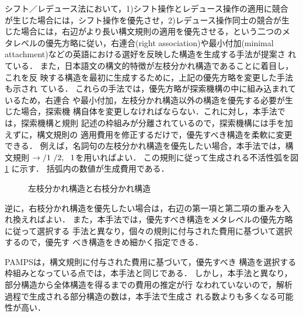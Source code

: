 シフト／レデュース法において，1)シフト操作とレデュース操作の適用に競合
が生じた場合には，シフト操作を優先させ，2)レデュース操作同士の競合が生
じた場合には，右辺がより長い構文規則の適用を優先させる，という二つのメ
タレベルの優先方略に従い，右連合(right association)や最小付加(minimal
attachment)などの英語における選好を反映した構造を生成する手法が提案さ
れている\cite{Shieber83}．
また，日本語文の構文的特徴が左枝分かれ構造であることに着目し，これを反
映する構造を最初に生成するために，上記の優先方略を変更した手法も示され
ている\cite{Shimazu89}． 
これらの手法では，優先方略が探索機構の中に組み込まれているため，右連合
や最小付加，左枝分かれ構造以外の構造を優先する必要が生じた場合，探索機
構自体を変更しなければならない．これに対し，本手法では，探索機構と規則
記述の枠組みが分離されているので，探索機構には手を加えずに，構文規則の
適用費用を修正するだけで，優先すべき構造を柔軟に変更できる．
例えば，名詞句の左枝分かれ構造を優先したい場合，本手法では，構文規則
$\NP \rightarrow \NP/1\ \NP/2,\ \ 1$を用いればよい．
この規則に従って生成される不活性弧を図\ref{fig:leftright} に示す．
括弧内の数値が生成費用である．
\begin{figure}
\begin{center}
\vspace{-0.5mm}
\end{center}
\caption{左枝分かれ構造と右枝分かれ構造}
\label{fig:leftright}
\vspace{-0.5mm}
\end{figure}
逆に，右枝分かれ構造を優先したい場合は，右辺の第一項と第二項の重みを入
れ換えればよい．
また，本手法では，優先すべき構造をメタレベルの優先方略に従って選択する
手法と異なり，個々の規則に付与された費用に基づいて選択するので，優先す
べき構造をきめ細かく指定できる．

PAMPS\cite{Uehara83}は，構文規則に付与された費用に基づいて，優先すべき
構造を選択する枠組みとなっている点では，本手法と同じである．
しかし，本手法と異なり，部分構造から全体構造を得るまでの費用の推定が行
なわれていないので，解析過程で生成される部分構造の数は，本手法で生成さ
れる数よりも多くなる可能性が高い．

